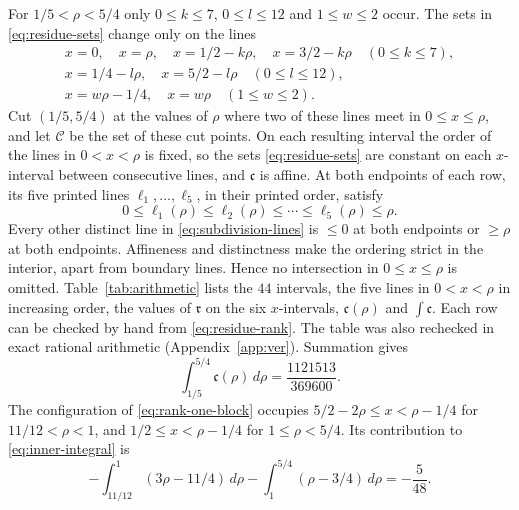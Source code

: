 \documentclass{amsart}
\numberwithin{equation}{section}
\numberwithin{table}{section}
\begin{document}
For $1/5<\rho<5/4$ only $0\le k\le7$, $0\le l\le12$ and $1\le w\le2$
occur. The sets in \eqref{eq:residue-sets} change only on the lines
\begin{equation}\label{eq:subdivision-lines}
\begin{gathered}
 x=0,\quad x=\rho,\quad
 x=1/2-k\rho,\quad x=3/2-k\rho\quad(0\le k\le7),\\
 x=1/4-l\rho,\quad x=5/2-l\rho\quad(0\le l\le12),\\
 x=w\rho-1/4,\quad x=w\rho\quad(1\le w\le2).
\end{gathered}
\end{equation}
Cut $(1/5,5/4)$ at the values of $\rho$ where two of these lines meet in
$0\le x\le\rho$, and let $\mathcal C$ be the set of these cut points. On
each resulting interval the order of the lines in
$0<x<\rho$ is fixed, so the sets \eqref{eq:residue-sets} are constant on
each $x$-interval between consecutive lines, and $\mathfrak c$ is affine.
At both endpoints of each row, its five printed lines
$\ell_1,\ldots,\ell_5$, in their printed order, satisfy
\[
 0\le \ell_1(\rho)\le \ell_2(\rho)\le\cdots\le\ell_5(\rho)\le\rho.
\]
Every other distinct line in \eqref{eq:subdivision-lines} is $\le0$ at
both endpoints or $\ge\rho$ at both endpoints. Affineness and distinctness
make the ordering strict in the interior, apart from boundary lines. Hence
no intersection in $0\le x\le\rho$ is omitted.
Table~\ref{tab:arithmetic} lists the $44$ intervals, the five lines in
$0<x<\rho$ in increasing order, the values of $\mathfrak r$ on the six
$x$-intervals, $\mathfrak c(\rho)$ and $\int \mathfrak c$. Each row can be checked by hand from
\eqref{eq:residue-rank}. The table was also rechecked in exact
rational arithmetic (Appendix~\ref{app:ver}). Summation gives
\begin{equation}\label{eq:inner-integral}
 \int_{1/5}^{5/4}\mathfrak c(\rho)\,d\rho=\frac{1121513}{369600}.
\end{equation}
The configuration of \eqref{eq:rank-one-block} occupies
$5/2-2\rho\le x<\rho-1/4$ for $11/12<\rho<1$, and
$1/2\le x<\rho-1/4$ for $1\le\rho<5/4$. Its contribution to
\eqref{eq:inner-integral} is
\begin{equation*}
 -\int_{11/12}^{1}(3\rho-11/4)\,d\rho
 -\int_1^{5/4}(\rho-3/4)\,d\rho=-\frac5{48}.
\end{equation*}
\end{document}
